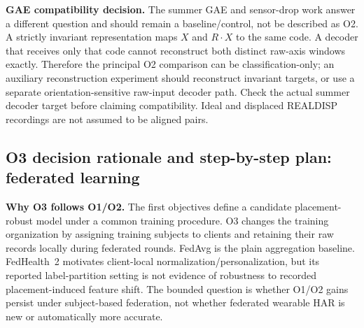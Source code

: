 \documentclass[10pt,a4paper]{article}
\begin{document}
\textbf{GAE compatibility decision.} The summer GAE and sensor-drop work answer a different question and should remain a baseline/control, not be described as O2. A strictly invariant representation maps $X$ and $R\cdot X$ to the same code. A decoder that receives only that code cannot reconstruct both distinct raw-axis windows exactly. Therefore the principal O2 comparison can be classification-only; an auxiliary reconstruction experiment should reconstruct invariant targets, or use a separate orientation-sensitive raw-input decoder path. Check the actual summer decoder target before claiming compatibility. Ideal and displaced REALDISP recordings are not assumed to be aligned pairs.

\subsection{O3 decision rationale and step-by-step plan: federated learning}
\textbf{Why O3 follows O1/O2.} The first objectives define a candidate placement-robust model under a common training procedure. O3 changes the training organization by assigning training subjects to clients and retaining their raw records locally during federated rounds. FedAvg is the plain aggregation baseline. FedHealth~2 motivates client-local normalization/personalization, but its reported label-partition setting is not evidence of robustness to recorded placement-induced feature shift. The bounded question is whether O1/O2 gains persist under subject-based federation, not whether federated wearable HAR is new or automatically more accurate.
\end{document}
